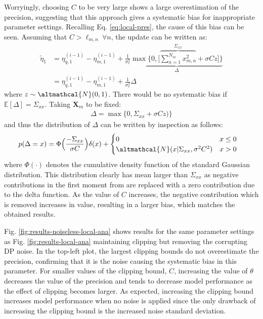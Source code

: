 Worryingly, choosing $C$ to be very large shows a large overestimation of the precision, suggesting that this approach gives a systematic bias for inappropriate parameter settings. Recalling Eq. \ref{eq:local-pres}, the cause of this bias can be seen. Assuming that $C> \ell_{m, n}\ \forall n$, the update can be written as:
 \begin{align}
 \tilde{\eta}_1 &= \eta_{q, 1}^{(i-1)} - \eta_{m, 1}^{(i-1)} + \frac{1}{\sigma_e^2} \underbrace{\max \Bigg \lbrace 0, \Bigg[ \overbrace{\sum_{n=1}^{N_m} {x_{m,n}^2}}^{\Sigma_{xx}} + \sigma C z \Bigg] \Bigg \rbrace}_{\Delta} \nonumber \\ 
 &=  \eta_{q, 1}^{(i-1)} - \eta_{m, 1}^{(i-1)} +  \frac{1}{\sigma_e^2} \Delta 
 \end{align}
 where $z \sim \altmathcal{N}(0, 1)$. There would be no systematic bias if $\mathbb{E}[\Delta] = \Sigma_{xx}$. Taking $\bm{X}_m$ to be fixed:
 \begin{align}
 \Delta = \max \lbrace 0, \Sigma_{xx} + \sigma C z)\rbrace
 \end{align}
 and thus the distribution of $\Delta$ can be written by inspection as follows:
 \begin{align}
 p(\Delta = x) &=  \Phi \Big(\frac{-\Sigma_{xx}}{\sigma C}\Big) \delta(x) + \begin{cases}
 0 \hspace{0.5cm} & x \leq 0 \\
 \altmathcal{N}(x| \Sigma_{xx}, \sigma^2 C^2) & x >0
 \end{cases}
 \end{align}
 where $\Phi(\cdot)$ denotes the cumulative density function of the standard Gaussian distribution. This distribution clearly has mean larger than $\Sigma_{xx}$ as negative contributions in the first moment from are replaced with a zero contribution due to the delta function. As the value of $C$ increases, the negative contribution which is removed increases in value, resulting in a larger bias, which matches the obtained results. 
 
  Fig. \ref{fig:results-noiseless-local-ana} shows results for the same parameter settings as Fig. \ref{fig:results-local-ana} maintaining clipping but removing the corrupting DP noise.  In the top-left plot, the largest clipping bounds do not overestimate the precision, confirming that it is the noise causing the systematic bias in this parameter. For smaller values of the clipping bound, $C$, increasing the value of $\theta$ decreases the value of the precision and tends to decrease model performance as the effect of clipping becomes larger. As expected, increasing the clipping bound increases model performance when no noise is applied since the only drawback of increasing the clipping bound is the increased noise standard deviation. 
 
